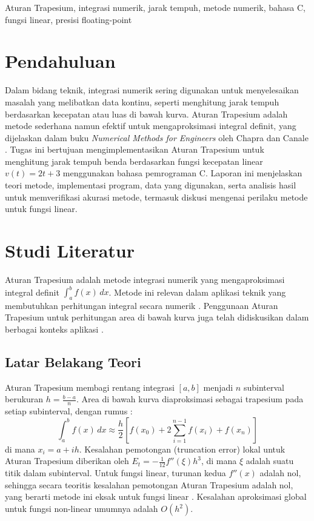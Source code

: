 \documentclass[conference]{IEEEtran}
\begin{document}
\begin{IEEEkeywords}
Aturan Trapesium, integrasi numerik, jarak tempuh, metode numerik, bahasa C, fungsi linear, presisi floating-point
\end{IEEEkeywords}

\section{Pendahuluan}
Dalam bidang teknik, integrasi numerik sering digunakan untuk menyelesaikan masalah yang melibatkan data kontinu, seperti menghitung jarak tempuh berdasarkan kecepatan atau luas di bawah kurva. Aturan Trapesium adalah metode sederhana namun efektif untuk mengaproksimasi integral definit, yang dijelaskan dalam buku \textit{Numerical Methods for Engineers} oleh Chapra dan Canale \cite{b1}. Tugas ini bertujuan mengimplementasikan Aturan Trapesium untuk menghitung jarak tempuh benda berdasarkan fungsi kecepatan linear \( v(t) = 2t + 3 \) menggunakan bahasa pemrograman C. Laporan ini menjelaskan teori metode, implementasi program, data yang digunakan, serta analisis hasil untuk memverifikasi akurasi metode, termasuk diskusi mengenai perilaku metode untuk fungsi linear.

\section{Studi Literatur}
Aturan Trapesium adalah metode integrasi numerik yang mengaproksimasi integral definit \( \int_a^b f(x) \, dx \). Metode ini relevan dalam aplikasi teknik yang membutuhkan perhitungan integral secara numerik \cite{b1}. Penggunaan Aturan Trapesium untuk perhitungan area di bawah kurva juga telah didiskusikan dalam berbagai konteks aplikasi \cite{b_yeh}.

\subsection{Latar Belakang Teori}
Aturan Trapesium membagi rentang integrasi \([a, b]\) menjadi \( n \) subinterval berukuran \( h = \frac{b-a}{n} \). Area di bawah kurva diaproksimasi sebagai trapesium pada setiap subinterval, dengan rumus \cite{b1}:
\begin{equation}
\int_a^b f(x) \, dx \approx \frac{h}{2} \left[ f(x_0) + 2 \sum_{i=1}^{n-1} f(x_i) + f(x_n) \right]
\label{eq:trapezoidal}
\end{equation}
di mana \( x_i = a + i h \). Kesalahan pemotongan (truncation error) lokal untuk Aturan Trapesium diberikan oleh \( E_t = -\frac{1}{12}f''(\xi)h^3 \), di mana \( \xi \) adalah suatu titik dalam subinterval. Untuk fungsi linear, turunan kedua \( f''(x) \) adalah nol, sehingga secara teoritis kesalahan pemotongan Aturan Trapesium adalah nol, yang berarti metode ini eksak untuk fungsi linear \cite{b1}. Kesalahan aproksimasi global untuk fungsi non-linear umumnya adalah \( O(h^2) \).
\end{document}
